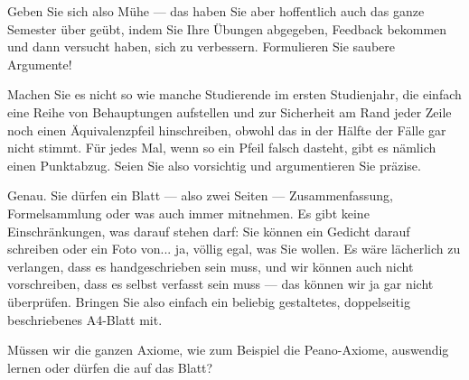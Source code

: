 \begin{ai-global-state-checkpoint-invisible-content}
\end{ai-global-state-checkpoint-invisible-content}

\begin{spoken-clean}[01:14:09 - 01:16:39]
Geben Sie sich also Mühe --- das haben Sie aber hoffentlich auch das ganze Semester über geübt, indem Sie Ihre Übungen abgegeben, Feedback bekommen und dann versucht haben, sich zu verbessern. Formulieren Sie saubere Argumente! 

Machen Sie es nicht so wie manche Studierende im ersten Studienjahr, die einfach eine Reihe von Behauptungen aufstellen und zur Sicherheit am Rand jeder Zeile noch einen Äquivalenzpfeil hinschreiben, obwohl das in der Hälfte der Fälle gar nicht stimmt. Für jedes Mal, wenn so ein Pfeil falsch dasteht, gibt es nämlich einen Punktabzug. Seien Sie also vorsichtig und argumentieren Sie präzise.

Genau. Sie dürfen ein Blatt --- also zwei Seiten --- Zusammenfassung, Formelsammlung oder was auch immer mitnehmen. Es gibt keine Einschränkungen, was darauf stehen darf: Sie können ein Gedicht darauf schreiben oder ein Foto von... ja, völlig egal, was Sie wollen. Es wäre lächerlich zu verlangen, dass es handgeschrieben sein muss, und wir können auch nicht vorschreiben, dass es selbst verfasst sein muss --- das können wir ja gar nicht überprüfen. Bringen Sie also einfach ein beliebig gestaltetes, doppelseitig beschriebenes A4-Blatt mit.
\end{spoken-clean}

\begin{student-interaction}[Studentenfrage]
Müssen wir die ganzen Axiome, wie zum Beispiel die Peano-Axiome, auswendig lernen oder dürfen die auf das Blatt?
\end{student-interaction}

